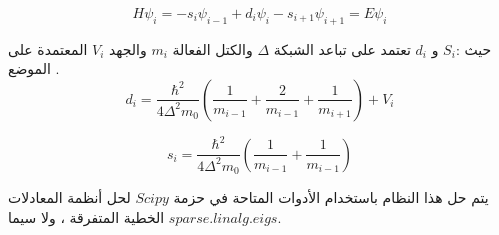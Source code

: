 \begin{equation}
	H\psi_i= -s_i\psi_{i-1}+d_i\psi_i-s_{i+1}\psi_{i+1}=E\psi_i
\end{equation}

  حيث :$ S_i $ و $ d_i $ تعتمد على تباعد الشبكة  $\Delta$ والكتل الفعالة $ m_i $ والجهد  $ V_i $ المعتمدة على الموضع .
\begin{equation}
	d_i=\frac{{\hbar}^2}{ 4\Delta^2 m_0}(\frac{1}{ m_{i-1}}+\frac{2}{ m_{i-1}}+\frac{1}{ m_{ i+1}}) +V_i
\end{equation}

\begin{equation}
	s_i=\frac{{\hbar}^2}{4\Delta^2 m_0 }(\frac{1}{ m_{i-1}}+\frac{1}{ m_{ i-1}})
\end{equation}

يتم حل هذا النظام باستخدام الأدوات المتاحة في حزمة $ Scipy $ لحل أنظمة المعادلات الخطية المتفرقة ، ولا سيما $ sparse.linalg.eigs $.



